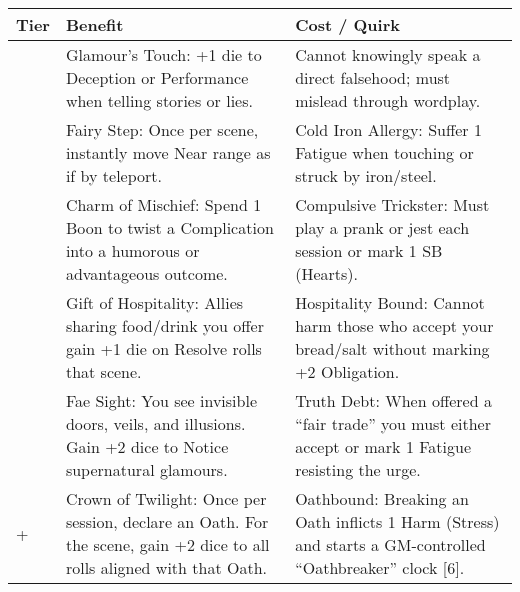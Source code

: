 \begin{longtable}{>{\raggedright\arraybackslash}p{1cm} p{5cm} p{5cm}}
\toprule
\textbf{Tier} & \textbf{Benefit} & \textbf{Cost / Quirk} \\
\midrule
1 & Glamour's Touch: +1 die to Deception or Performance when telling stories or lies. & Cannot knowingly speak a direct falsehood; must mislead through wordplay. \\
\midrule
2 & Fairy Step: Once per scene, instantly move Near range as if by teleport. & Cold Iron Allergy: Suffer 1 Fatigue when touching or struck by iron/steel. \\
\midrule
3 & Charm of Mischief: Spend 1 Boon to twist a Complication into a humorous or advantageous outcome. & Compulsive Trickster: Must play a prank or jest each session or mark 1 SB (Hearts). \\
\midrule
4 & Gift of Hospitality: Allies sharing food/drink you offer gain +1 die on Resolve rolls that scene. & Hospitality Bound: Cannot harm those who accept your bread/salt without marking +2 Obligation. \\
\midrule
5 & Fae Sight: You see invisible doors, veils, and illusions. Gain +2 dice to Notice supernatural glamours. & Truth Debt: When offered a “fair trade” you must either accept or mark 1 Fatigue resisting the urge. \\
\midrule
6+ & Crown of Twilight: Once per session, declare an Oath. For the scene, gain +2 dice to all rolls aligned with that Oath. & Oathbound: Breaking an Oath inflicts 1 Harm (Stress) and starts a GM-controlled “Oathbreaker” clock [6]. \\
\bottomrule
\end{longtable}